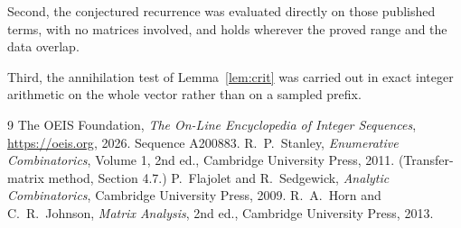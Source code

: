 \documentclass[11pt,a4paper]{article}
\theoremstyle{plain}
\theoremstyle{definition}
\begin{document}
Second, the conjectured recurrence was evaluated directly on those published terms, with no
matrices involved, and holds wherever the proved range and the data overlap.

Third, the annihilation test of Lemma~\ref{lem:crit} was carried out in exact integer
arithmetic on the whole vector rather than on a sampled prefix.

\begin{thebibliography}{9}
 The OEIS Foundation, \emph{The On-Line Encyclopedia of Integer
Sequences}, \url{https://oeis.org}, 2026. Sequence A200883.
 R.~P.~Stanley, \emph{Enumerative Combinatorics}, Volume 1, 2nd ed.,
Cambridge University Press, 2011. (Transfer-matrix method, Section 4.7.)
 P.~Flajolet and R.~Sedgewick, \emph{Analytic Combinatorics}, Cambridge
University Press, 2009.
 R.~A.~Horn and C.~R.~Johnson, \emph{Matrix Analysis}, 2nd ed., Cambridge
University Press, 2013.
\end{thebibliography}
\end{document}
